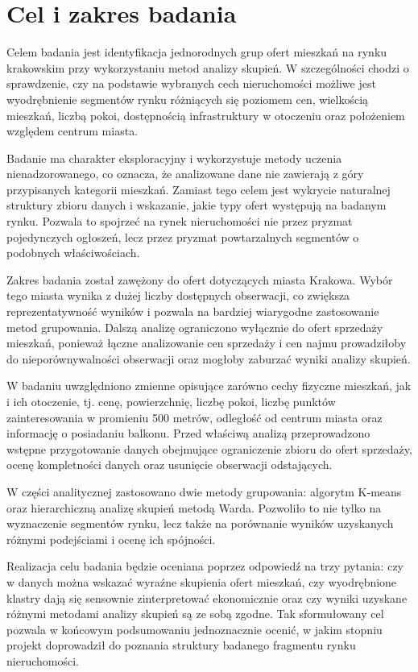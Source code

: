 \documentclass{report}
\begin{document}
\section{Cel i zakres badania}

Celem badania jest identyfikacja jednorodnych grup ofert mieszkań na rynku krakowskim przy wykorzystaniu metod analizy skupień. W szczególności chodzi o sprawdzenie, czy na podstawie wybranych cech nieruchomości możliwe jest wyodrębnienie segmentów rynku różniących się poziomem cen, wielkością mieszkań, liczbą pokoi, dostępnością infrastruktury w otoczeniu oraz położeniem względem centrum miasta.

Badanie ma charakter eksploracyjny i wykorzystuje metody uczenia nienadzorowanego, co oznacza, że analizowane dane nie zawierają z góry przypisanych kategorii mieszkań. Zamiast tego celem jest wykrycie naturalnej struktury zbioru danych i wskazanie, jakie typy ofert występują na badanym rynku. Pozwala to spojrzeć na rynek nieruchomości nie przez pryzmat pojedynczych ogłoszeń, lecz przez pryzmat powtarzalnych segmentów o podobnych właściwościach.

Zakres badania został zawężony do ofert dotyczących miasta Krakowa. Wybór tego miasta wynika z dużej liczby dostępnych obserwacji, co zwiększa reprezentatywność wyników i pozwala na bardziej wiarygodne zastosowanie metod grupowania. Dalszą analizę ograniczono wyłącznie do ofert sprzedaży mieszkań, ponieważ łączne analizowanie cen sprzedaży i cen najmu prowadziłoby do nieporównywalności obserwacji oraz mogłoby zaburzać wyniki analizy skupień.

W badaniu uwzględniono zmienne opisujące zarówno cechy fizyczne mieszkań, jak i ich otoczenie, tj. cenę, powierzchnię, liczbę pokoi, liczbę punktów zainteresowania w promieniu 500 metrów, odległość od centrum miasta oraz informację o posiadaniu balkonu. Przed właściwą analizą przeprowadzono wstępne przygotowanie danych obejmujące ograniczenie zbioru do ofert sprzedaży, ocenę kompletności danych oraz usunięcie obserwacji odstających.

W części analitycznej zastosowano dwie metody grupowania: algorytm K-means oraz hierarchiczną analizę skupień metodą Warda. Pozwoliło to nie tylko na wyznaczenie segmentów rynku, lecz także na porównanie wyników uzyskanych różnymi podejściami i ocenę ich spójności.

Realizacja celu badania będzie oceniana poprzez odpowiedź na trzy pytania: czy w danych można wskazać wyraźne skupienia ofert mieszkań, czy wyodrębnione klastry dają się sensownie zinterpretować ekonomicznie oraz czy wyniki uzyskane różnymi metodami analizy skupień są ze sobą zgodne. Tak sformułowany cel pozwala w końcowym podsumowaniu jednoznacznie ocenić, w jakim stopniu projekt doprowadził do poznania struktury badanego fragmentu rynku nieruchomości.
\end{document}
